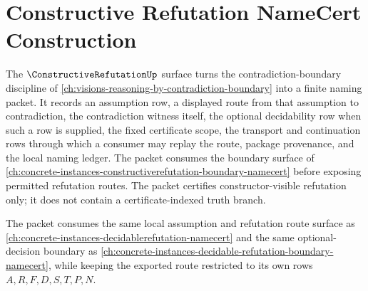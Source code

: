 \chapter{Constructive Refutation NameCert Construction}
\label{ch:concrete-instances-constructiverefutation-namecert}

The $\ConstructiveRefutationUp$ surface turns the contradiction-boundary discipline of \autoref{ch:visions-reasoning-by-contradiction-boundary} into a finite naming packet. It records an assumption row, a displayed route from that assumption to contradiction, the contradiction witness itself, the optional decidability row when such a row is supplied, the fixed certificate scope, the transport and continuation rows through which a consumer may replay the route, package provenance, and the local naming ledger. The packet consumes the boundary surface of \autoref{ch:concrete-instances-constructiverefutation-boundary-namecert} before exposing permitted refutation routes. The packet certifies constructor-visible refutation only; it does not contain a certificate-indexed truth branch.

The packet consumes the same local assumption and refutation route surface as \autoref{ch:concrete-instances-decidablerefutation-namecert} and the same optional-decision boundary as \autoref{ch:concrete-instances-decidable-refutation-boundary-namecert}, while keeping the exported route restricted to its own rows $A,R,F,D,S,T,P,N$.

